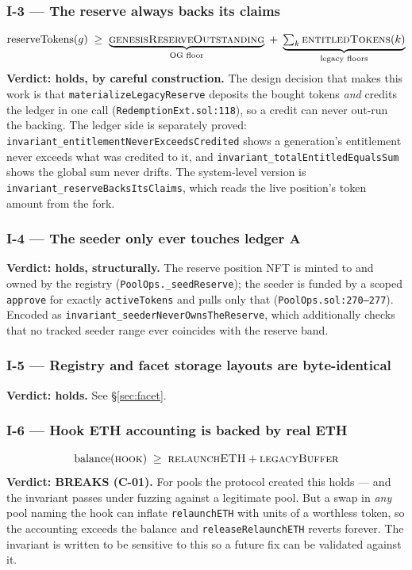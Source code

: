 \documentclass[10pt,a4paper]{article}
\newcommand{\code}[1]{\texttt{\small #1}}
\begin{document}
\subsubsection*{I-3 --- The reserve always backs its claims}
\[
\mathrm{reserveTokens}(g) \;\ge\;
\underbrace{\textsc{genesisReserveOutstanding}}_{\text{OG floor}}
\;+\;
\underbrace{\textstyle\sum_{k}\textsc{entitledTokens}(k)}_{\text{legacy floors}}
\]
\textbf{Verdict: holds, by careful construction.} The design decision that makes
this work is that \code{materializeLegacyReserve} deposits the bought tokens
\emph{and} credits the ledger in one call
(\code{RedemptionExt.sol:118}), so a credit can never out-run the backing. The
ledger side is separately proved: \code{invariant\_entitlementNeverExceedsCredited}
shows a generation's entitlement never exceeds what was credited to it, and
\code{invariant\_totalEntitledEqualsSum} shows the global sum never drifts.
The system-level version is \code{invariant\_reserveBacksItsClaims}, which reads
the live position's token amount from the fork.

\subsubsection*{I-4 --- The seeder only ever touches ledger A}
\textbf{Verdict: holds, structurally.} The reserve position NFT is minted to and
owned by the registry (\code{PoolOps.\_seedReserve}); the seeder is funded by a
scoped \code{approve} for exactly \code{activeTokens} and pulls only that
(\code{PoolOps.sol:270--277}). Encoded as
\code{invariant\_seederNeverOwnsTheReserve}, which additionally checks that no
tracked seeder range ever coincides with the reserve band.

\subsubsection*{I-5 --- Registry and facet storage layouts are byte-identical}
\textbf{Verdict: holds.} See \S\ref{sec:facet}.

\subsubsection*{I-6 --- Hook ETH accounting is backed by real ETH}
\[
\mathrm{balance}(\textsc{hook}) \;\ge\; \textsc{relaunchETH} + \textsc{legacyBuffer}
\]
\textbf{Verdict: BREAKS (\textbf{C-01}).} For pools the protocol created this
holds --- and the invariant passes under fuzzing against a legitimate pool. But
a swap in \emph{any} pool naming the hook can inflate \code{relaunchETH} with
units of a worthless token, so the accounting exceeds the balance and
\code{releaseRelaunchETH} reverts forever. The invariant is written to be
sensitive to this so a future fix can be validated against it.
\end{document}
